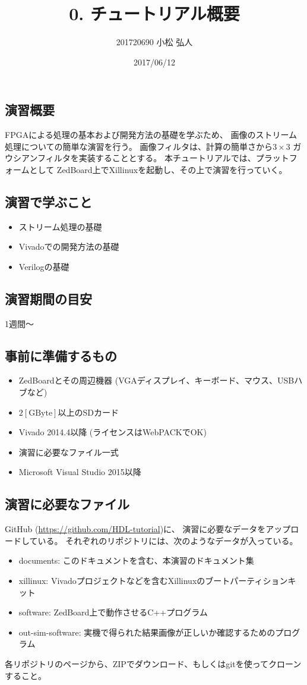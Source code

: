 \documentclass[11pt]{jsarticle}
\title{0. チュートリアル概要}
\author{201720690 小松 弘人}
\date{2017/06/12}
\begin{document}
\maketitle
\subsection*{演習概要}
FPGAによる処理の基本および開発方法の基礎を学ぶため、
画像のストリーム処理についての簡単な演習を行う。
画像フィルタは、計算の簡単さから$3\!\times\!3$
ガウシアンフィルタを実装することとする。
本チュートリアルでは、プラットフォームとして
ZedBoard上でXillinuxを起動し、その上で演習を行っていく。

\subsection*{演習で学ぶこと}
\begin{itemize}
	\item
		ストリーム処理の基礎
	\item
		Vivadoでの開発方法の基礎
	\item
		Verilogの基礎
\end{itemize}

\subsection*{演習期間の目安}
1週間～

\subsection*{事前に準備するもの}
\begin{itemize}
	\item
		ZedBoardとその周辺機器 (VGAディスプレイ、キーボード、マウス、USBハブなど)
	\item
		$2\mathrm{[GByte]}$以上のSDカード
	\item
		Vivado 2014.4以降 (ライセンスはWebPACKでOK)
	\item
		演習に必要なファイル一式
	\item
		Microsoft Visual Studio 2015以降
\end{itemize}

\subsection*{演習に必要なファイル}
GitHub (\url{https://github.com/HDL-tutorial})に、
演習に必要なデータをアップロードしている。
それぞれのリポジトリには、次のようなデータが入っている。

\begin{itemize}
	\item
		documents: このドキュメントを含む、本演習のドキュメント集
	\item
		xillinux: Vivadoプロジェクトなどを含むXillinuxのブートパーティションキット
	\item
		software: ZedBoard上で動作させるC++プログラム
	\item
		out-sim-software: 実機で得られた結果画像が正しいか確認するためのプログラム
\end{itemize}

各リポジトリのページから、ZIPでダウンロード、もしくはgitを使ってクローンすること。
\end{document}
